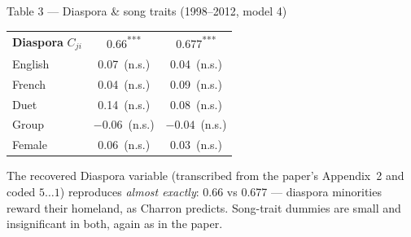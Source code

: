 \documentclass[aspectratio=169,10pt]{beamer}
\newcommand{\paper}[1]{{\color{papercol}#1}}
\newcommand{\rep}[1]{{\color{repcol}#1}}
\newcommand{\pstar}[1]{{\color{papercol}\textsuperscript{#1}}}
\newcommand{\rstar}[1]{{\color{repcol}\textsuperscript{#1}}}
\newcommand{\phead}[1]{\cellcolor{papercol!12}\paper{\textbf{#1}}}
\newcommand{\rhead}[1]{\cellcolor{repcol!12}\rep{\textbf{#1}}}
\begin{document}
\begin{frame}{Table 3 --- Diaspora \& song traits (1998--2012, model 4)}
  \centering\small
  \renewcommand{\arraystretch}{1.25}
  \begin{tabular}{@{}l c c@{}}
    \toprule
    & \phead{Charron M4} & \rhead{Replication M4}\\
    \midrule
    \rowcolor{yellow!25}
    \textbf{Diaspora} $C_{ji}$ & 0.66\pstar{***} & 0.677\rstar{***}\\
    English & 0.07\ (n.s.) & 0.04\ (n.s.)\\
    French  & 0.04\ (n.s.) & 0.09\ (n.s.)\\
    Duet    & 0.14\ (n.s.) & 0.08\ (n.s.)\\
    Group   & $-0.06$\ (n.s.) & $-0.04$\ (n.s.)\\
    Female  & 0.06\ (n.s.) & 0.03\ (n.s.)\\
    \bottomrule
  \end{tabular}

  \vspace{6pt}
  \footnotesize
  The recovered \colorbox{yellow!25}{Diaspora} variable (transcribed from the paper's
  Appendix~2 and coded $5\ldots1$) reproduces \emph{almost exactly}: \paper{0.66}
  vs \rep{0.677} --- diaspora minorities reward their homeland, as Charron predicts.
  Song-trait dummies are small and insignificant in both, again as in the paper.
\end{frame}

\end{document}
